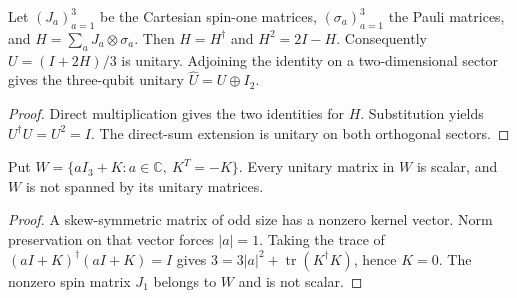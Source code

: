 \begin{lemma}
    \label{thm:mpu_spin_one_reflection}
    \leanok
    Let $(J_a)_{a=1}^3$ be the Cartesian spin-one matrices,
    $(\sigma_a)_{a=1}^3$ the Pauli matrices, and
    $H=\sum_aJ_a\otimes\sigma_a$. Then
    $H=H^\dagger$ and $H^2=2I-H$.
    Consequently $U=(I+2H)/3$ is unitary.
    Adjoining the identity on a two-dimensional sector gives
    the three-qubit unitary $\widehat U=U\oplus I_2$.
\end{lemma}
\begin{proof}\leanok
    Direct multiplication gives the two identities for $H$.
    Substitution yields $U^\dagger U=U^2=I$.
    The direct-sum extension is unitary on both orthogonal sectors.
\end{proof}

\begin{lemma}
    \label{thm:mpu_spin_one_unitary_space}
    \leanok
    Put $W=\{aI_3+K:a\in\mathbb C,\ K^T=-K\}$.
    Every unitary matrix in $W$ is scalar, and $W$ is not spanned
    by its unitary matrices.
\end{lemma}
\begin{proof}\leanok
    A skew-symmetric matrix of odd size has a nonzero kernel vector.
    Norm preservation on that vector forces $|a|=1$.
    Taking the trace of $(aI+K)^\dagger(aI+K)=I$ gives
    $3=3|a|^2+\operatorname{tr}(K^\dagger K)$, hence $K=0$.
    The nonzero spin matrix $J_1$ belongs to $W$ and is not scalar.
\end{proof}

